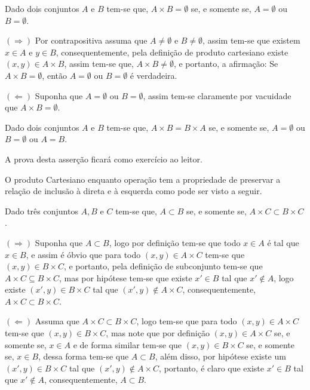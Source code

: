 \begin{teorema}\label{teo:AbsorcaoCatersiano}
	Dado dois conjuntos $A$ e $B$ tem-se que, $A \times B = \emptyset$ se, e somente se, $A = \emptyset$ ou $B = \emptyset$.
\end{teorema}

\begin{prova}
	$(\Rightarrow)$ Por contrapositiva assuma que $A \neq \emptyset$ e $B \neq \emptyset$, assim tem-se que existem $x \in A$ e $y \in B$, consequentemente, pela definição de produto cartesiano existe $(x,y) \in A \times B$, assim tem-se que, $A \times B \neq \emptyset$, e portanto, a afirmação: Se $A \times B = \emptyset$, então $A = \emptyset$ ou $B = \emptyset$ é verdadeira.
	
	$(\Leftarrow)$ Suponha que $A = \emptyset$ ou $B = \emptyset$, assim tem-se claramente por vacuidade que $A \times B = \emptyset$.
\end{prova}

\begin{teorema}\label{teo:IgualdadeCartesiano}
	Dado dois conjuntos $A$ e $B$ tem-se que, $A \times B = B \times A$ se, e somente se, $A = \emptyset$ ou $B = \emptyset$ ou $A = B$.
\end{teorema}

\begin{prova}
	A prova desta asserção ficará como exercício ao leitor.
\end{prova}

O produto Cartesiano enquanto operação tem a propriedade de preservar a relação de inclusão à direta e à esquerda como pode ser visto a seguir. 

\begin{teorema}\label{teo:CartesianoMonoDireita}
	Dado três conjuntos $A, B$ e $C$ tem-se que, $A \subset B$ se, e somente se, $A \times C \subset B \times C$.
\end{teorema}

\begin{prova}
	$(\Rightarrow)$ Suponha que $A \subset B$, logo por definição tem-se que todo $x \in A$ é tal que $x \in B$, e assim é óbvio que para todo $(x,y) \in A \times C$ tem-se que $(x, y) \in B \times C$, e portanto, pela definição de subconjunto tem-se que $A \times C \subseteq B \times C$, mas por hipótese tem-se que existe $x' \in B$ tal que $x' \notin A$, logo existe $(x', y) \in B \times C$ tal que $(x', y) \notin A \times C$, consequentemente, $A \times C \subset B \times C$.
	
	$(\Leftarrow)$ Assuma que $A \times C \subset B \times C$, logo tem-se que para todo $(x, y) \in A \times C$ tem-se que $(x, y) \in B \times C$, mas note que por definição $(x, y) \in A \times C$ se, e somente se, $x \in A$ e de forma similar tem-se que $(x, y) \in B \times C$ se, e somente se, $x \in B$, dessa forma tem-se que $A \subset B$, além disso, por hipótese existe um $(x', y) \in B \times C$ tal que $(x', y) \notin A \times C$, portanto, é claro que existe $x' \in B$ tal que $x' \notin A$, consequentemente, $A \subset B$.
\end{prova}


